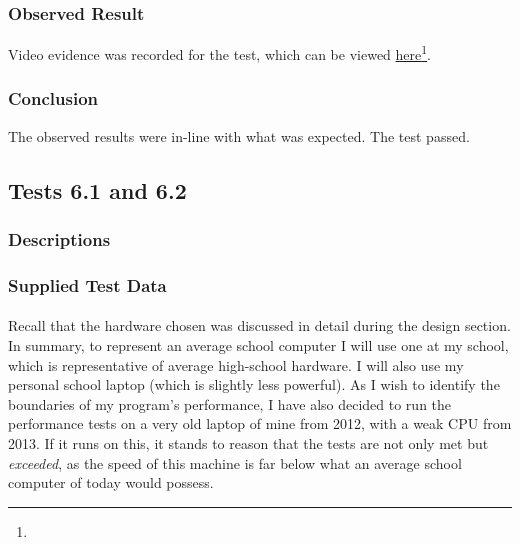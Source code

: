\subsubsection*{Observed Result}
\label{sec:evidence5.4}
Video evidence was recorded for the test, which can be viewed \href{}{here}\footnote{

}.

\subsubsection*{Conclusion}
The observed results were in-line with what was expected. The test passed.


\pagebreak
\subsection{Tests 6.1 and 6.2}
\subsubsection*{Descriptions}
\paragraph{}
{
	\centering
}

\subsubsection*{Supplied Test Data}
\paragraph{}
Recall that the hardware chosen was discussed in detail during the design section. In summary, to represent an average school computer I will use one at my school, which is representative of average high-school hardware. I will also use my personal school laptop (which is slightly less powerful). As I wish to identify the boundaries of my program's performance, I have also decided to run the performance tests on a very old laptop of mine from 2012, with a weak CPU from 2013. If it runs on this, it stands to reason that the tests are not only met but \textit{exceeded}, as the speed of this machine is far below what an average school computer of today would possess.  

